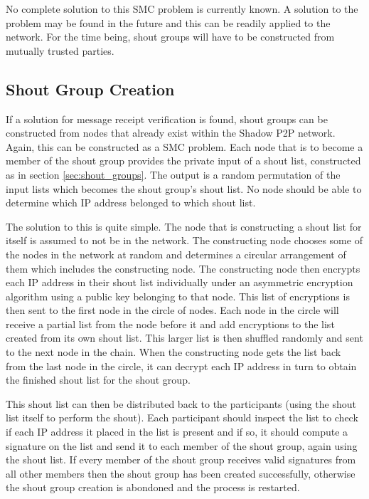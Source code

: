 \documentclass[ %
                    author={Luke Murray},
                supervisor={Dr. Simon Hollis},
                     title={Shadow Peer-to-Peer Networks},
                  subtitle={},
                    degree={MEng},
                      year={2013} ]{thesis}
\begin{document}

No complete solution to this SMC problem is currently known. A solution to the problem may be found in the future and this can be readily applied to the network. For the time being, shout groups will have to be constructed from mutually trusted parties.

\subsection{Shout Group Creation}

If a solution for message receipt verification is found, shout groups can be constructed from nodes that already exist within the Shadow P2P network. Again, this can be constructed as a SMC problem. Each node that is to become a member of the shout group provides the private input of a shout list, constructed as in section \ref{sec:shout_groups}. The output is a random permutation of the input lists which becomes the shout group's shout list. No node should be able to determine which IP address belonged to which shout list.

The solution to this is quite simple. The node that is constructing a shout list for itself is assumed to not be in the network. The constructing node chooses some of the nodes in the network at random and determines a circular arrangement of them which includes the constructing node. The constructing node then encrypts each IP address in their shout list individually under an asymmetric encryption algorithm using a public key belonging to that node. This list of encryptions is then sent to the first node in the circle of nodes. Each node in the circle will receive a partial list from the node before it and add encryptions to the list created from its own shout list. This larger list is then shuffled randomly and sent to the next node in the chain. When the constructing node gets the list back from the last node in the circle, it can decrypt each IP address in turn to obtain the finished shout list for the shout group.

This shout list can then be distributed back to the participants (using the shout list itself to perform the shout). Each participant should inspect the list to check if each IP address it placed in the list is present and if so, it should compute a signature on the list and send it to each member of the shout group, again using the shout list. If every member of the shout group receives valid signatures from all other members then the shout group has been created successfully, otherwise the shout group creation is abondoned and the process is restarted.
\end{document}
